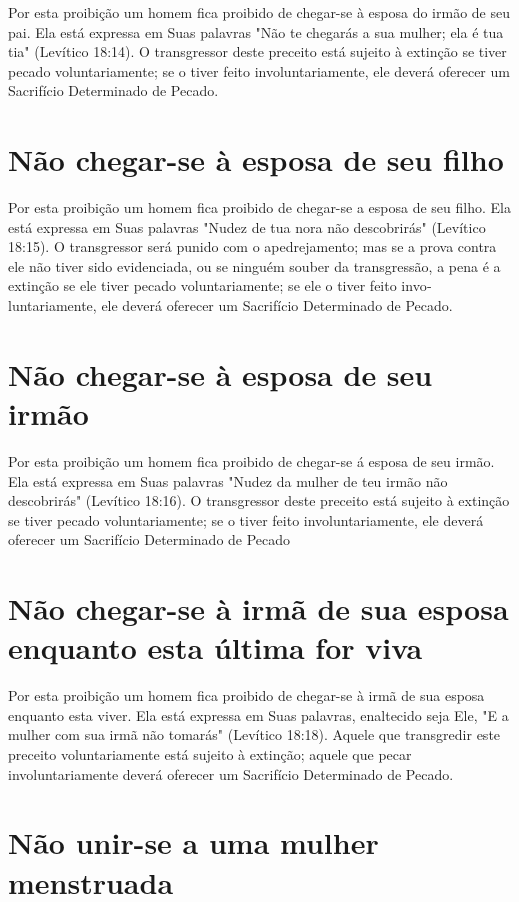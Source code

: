 \begin{itemize}
\begin{enumrate}
\begin{itemize}
\begin{itemize}
\begin{itemize}
Por esta proibição um homem fica proibido de chegar-se à esposa do irmão
de seu pai. Ela está expressa em Suas palavras "Não te chegarás a sua
mulher; ela é tua tia" (Levítico 18:14). O transgressor deste preceito
está sujei­to à extinção se tiver pecado voluntariamente; se o tiver
feito involuntariamen­te, ele deverá oferecer um Sacrifício Determinado
de Pecado.

\section{Não chegar-se à esposa de seu filho}

Por esta proibição um homem fica proibido de chegar-se a esposa de seu
filho. Ela está expressa em Suas palavras "Nudez de tua nora não
descobrirás" (Levítico 18:15). O transgressor será punido com o
apedrejamento; mas se a pro­va contra ele não tiver sido evidenciada, ou
se ninguém souber da transgressão, a pena é a extinção se ele tiver
pecado voluntariamente; se ele o tiver feito invo­luntariamente, ele
deverá oferecer um Sacrifício Determinado de Pecado.

\section{Não chegar-se à esposa de seu irmão}

Por esta proibição um homem fica proibido de chegar-se á esposa de seu
irmão. Ela está expressa em Suas palavras "Nudez da mulher de teu ir­mão
não descobrirás" (Levítico 18:16). O transgressor deste preceito está
sujei­to à extinção se tiver pecado voluntariamente; se o tiver feito
involuntariamen­te, ele deverá oferecer um Sacrifício Determinado de
Pecado

\section{Não chegar-se à irmã de sua esposa enquanto esta última for viva}

Por esta proibição um homem fica proibido de chegar-se à irmã de sua
esposa enquanto esta viver. Ela está expressa em Suas palavras,
enaltecido seja Ele, "E a mulher com sua irmã não tomarás" (Levítico
18:18). Aquele que transgredir este preceito voluntariamente está
sujeito à extinção; aquele que pe­car involuntariamente deverá oferecer
um Sacrifício Determinado de Pecado.

\section{Não unir-se a uma mulher menstruada}


\end{itemize}
\end{itemize}
\end{itemize}
\end{enumrate}
\end{itemize}
